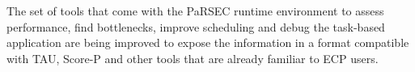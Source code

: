 
The set of tools that come with the PaRSEC runtime environment to
assess performance, find bottlenecks, improve scheduling and debug the
task-based application are being improved to expose the information
in a format compatible with TAU, Score-P and other
tools that are already familiar to ECP users.
